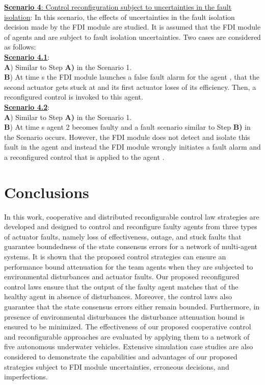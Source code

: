 \documentclass[12pt,draftcls,onecolumn]{IEEEtran}
\begin{document}
  \underline{  \textbf{Scenario 4}: Control reconfiguration subject to uncertainties in the fault isolation}: In this scenario, the effects of uncertainties in the fault isolation decision made by the FDI module are studied. It is assumed that the FDI module of agents  and  are subject to fault isolation uncertainties. Two cases are considered as follows: \\
 \underline{  \textbf{Scenario 4.1}}:\\
  \textbf{A}) Similar to Step \textbf{A)} in the Scenario 1.\\
  \textbf{B}) At  time s the FDI module  launches a  false fault alarm for  the agent , that the second actuator gets stuck at  and its first actuator loses  of its efficiency.  
  Then, a reconfigured control is invoked to this agent.\\
  \underline{   \textbf{Scenario 4.2}}:\\
   \textbf{A}) Similar to Step \textbf{A)} in the Scenario 1.\\
  \textbf{B}) At  time  s agent 2 becomes faulty and a fault scenario similar to Step \textbf{B)} in the Scenario  occurs. However, the FDI module  does not detect and isolate this fault in the agent  and instead the FDI module  wrongly initiates a fault alarm and a reconfigured control that is applied to the agent . \par


\section{Conclusions }\label{conclusion}
In this work, cooperative and distributed reconfigurable control law strategies are developed and designed to control and reconfigure  faulty agents from three types of actuator faults, namely loss of effectiveness, outage, and stuck faults that guarantee boundedness  of the state consensus errors for a network of multi-agent systems.
  It is shown that the proposed control strategies can ensure an  performance bound attenuation for the  team agents  when they are  subjected to environmental disturbances and actuator faults. 
 Our proposed reconfigured control laws ensure that the output of the faulty agent matches that of the healthy agent   in absence of disturbances.  Moreover, the control laws also guarantee that 
 the state consensus errors either remain bounded. Furthermore, in presence of environmental disturbances the  disturbance attenuation bound is ensured to be minimized. The effectiveness of our proposed cooperative control and reconfigurable approaches are evaluated by applying them to a network of five autonomous underwater vehicles. Extensive simulation case studies are also considered to demonstrate  the capabilities and advantages of our proposed strategies subject to FDI module uncertainties, erroneous decisions, and imperfections.


\end{document}
